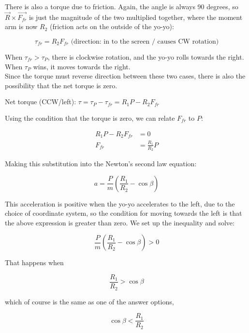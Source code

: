 \documentclass[8.01x]{subfiles}
\begin{document}
There is also a torque due to friction. Again, the angle is always 90 degrees, so $\vec{R} \times \vec{F_{fr}}$ is just the magnitude of the two multiplied together, where the moment arm is now $R_2$ (friction acts on the outside of the yo-yo):

\begin{equation}
\tau_{fr} = R_2 F_{fr} \text{ (direction: in to the screen / causes CW rotation)}
\end{equation}

When $\tau_{fr} > \tau_P$, there is clockwise rotation, and the yo-yo rolls towards the right. When $\tau_P$ wins, it moves towards the right.\\
Since the torque must reverse direction between these two cases, there is also the possibility that the net torque is zero.

Net torque (CCW/left): $\tau = \tau_P - \tau_{fr} = R_1 P - R_2 F_{fr}$

Using the condition that the torque is zero, we can relate $F_{fr}$ to $P$:

\begin{align}
R_1 P - R_2 F_{fr} &= 0\\
F_{fr} &= \frac{R_1}{R_2} P
\end{align}

Making this substitution into the Newton's second law equation:

\begin{equation}
a = \frac{P}{m} \left(\frac{R_1}{R_2} - \cos \beta\right)
\end{equation}

This acceleration is positive when the yo-yo accelerates to the left, due to the choice of coordinate system, so the condition for moving towards the left is that the above expression is greater than zero. We set up the inequality and solve:

\begin{equation}
\frac{P}{m} \left(\frac{R_1}{R_2} - \cos \beta\right) > 0
\end{equation}

That happens when

\begin{equation}
\frac{R_1}{R_2} > \cos \beta
\end{equation}

which of course is the same as one of the answer options,

\begin{equation}
\cos \beta < \frac{R_1}{R_2}
\end{equation}
\end{document}
